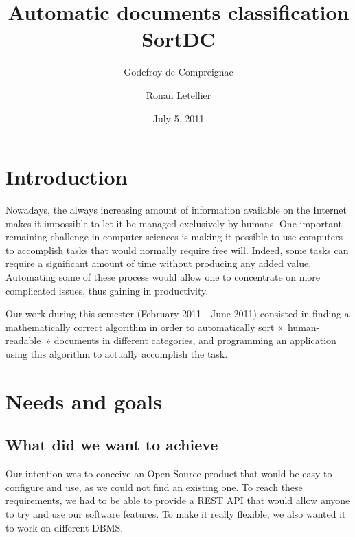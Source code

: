 \documentclass[a4paper,11pt]{article}
\title{Automatic documents classification\\
SortDC}
\author{Godefroy de Compreignac \and Ronan Letellier}
\date{July 5, 2011}
\begin{document}

\maketitle

\setcounter{page}{0}
\thispagestyle{empty}



\clearpage
\tableofcontents{}



\clearpage
\section*{Introduction}

Nowadays, the always increasing amount of information available on the
Internet makes it impossible to let it be managed exclusively by humans. One
important remaining challenge in computer sciences is making it possible to
use computers to accomplish tasks that would normally require free will.
Indeed, some tasks can require a significant amount of time without producing
any added value. Automating some of these process would allow one to
concentrate on more complicated issues, thus gaining in productivity.

Our work during this semester (February 2011 - June 2011) consisted in finding
a mathematically correct algorithm in order to automatically sort
«~human-readable~» documents in different categories, and programming an
application using this algorithm to actually accomplish the task.



\section{Needs and goals}


\subsection{What did we want to achieve}

Our intention was to conceive an Open Source product that would be easy to
configure and use, as we could not find an existing one. To reach these
requirements, we had to be able to provide a REST API that would allow anyone
to try and use our software features. To make it really flexible, we also
wanted it to work on different DBMS.
\end{document}
